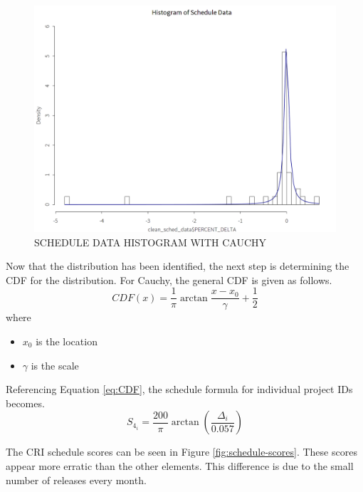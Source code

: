 \documentclass[SDSUThesis.tex]{subfiles}
\begin{document}
        \begin{figure}[htb]
            \centering
            \includegraphics[scale=.25]{images/schedule_hist.png}
            \caption{SCHEDULE DATA HISTOGRAM WITH CAUCHY}
            \label{fig:schedule-hist}
        \end{figure}
        
        Now that the distribution has been identified, the next step
        is determining the CDF
        for the distribution.  For Cauchy, the general CDF is 
        given as follows.
        \[
            CDF(x) = \frac{1}{\pi}\arctan{\frac{x-x_0}{\gamma}} + \frac{1}{2}
        \]
        where 
        \begin{itemize}
            \item $x_0$ is the location
            \item $\gamma$ is the scale
        \end{itemize}
        
        Referencing Equation \ref{eq:CDF}, the schedule formula
        for individual project IDs becomes.
        \[
           S_{4_i} = \frac{200}{\pi}\arctan{\left(\frac{\Delta_i}{0.057} \right)} 
        \]
        
        The CRI schedule scores can be seen in Figure \ref{fig:schedule-scores}.
        These scores appear more erratic than the other elements.
        This difference is due to the small number of releases every month.
        
\end{document}
